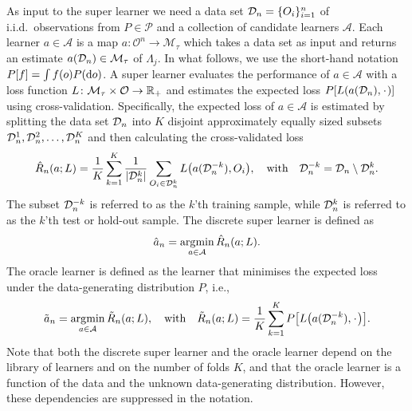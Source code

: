 As input to the super learner we need a data set
\( \mathcal{D}_n=\{O_i\}_{i=1}^n \) of i.i.d.\ observations from \( P \in \mathcal{P} \) and a collection of candidate
learners $\mathcal{A}$. Each learner \(a \in \mathcal{A}\) is a map
\( a \colon \mathcal{O}^n \rightarrow \mathcal{M}_{\tau}\) which takes a data
set as input and returns an estimate $a(\mathcal{D}_n) \in \mathcal{M}_{\tau}$ of
$\Lambda_{j}$.
In what follows, we use the short-hand notation
\(P[f] = \int f(o) P(\mathop{}\!\mathrm{d} o) \). A super learner evaluates the
performance of \(a \in \mathcal{A}\) with a loss function
\(L\colon \mathcal{M}_{\tau} \times \mathcal{O} \rightarrow \mathbb{R}_+\) and
estimates the expected loss \(P[L(a(\data_n), \blank)]\) using
cross-validation. Specifically, the expected loss of $a\in\mathcal A$
is estimated by splitting the data set $\mathcal{D}_n$ into $K$ disjoint
approximately equally sized subsets
\(\mathcal{D}_n^1, \mathcal{D}_n^2, \dots, \mathcal{D}_n^K \) and then calculating the
cross-validated loss
\begin{equation*}
  \hat{R}_n(a; L) =
  \frac{1}{K}\sum_{k=1}^{K}
  \frac{1}{| \mathcal{D}_n^{k} |}\sum_{O_i \in \mathcal{D}_n^{k}}
  L
  {
    \left(
      a{ (\mathcal{D}_n^{-k})}
      , O_i
    \right)
  },
  \quad \text{with} \quad
  \mathcal{D}_n^{-k} = \mathcal{D}_n \setminus \mathcal{D}_n^{k}.
\end{equation*}
The subset \(\mathcal{D}_n^{-k}\) is referred to as the \(k\)'th training
sample, while \(\mathcal{D}_n^{k}\) is referred to as the \(k\)'th test or
hold-out sample.
The discrete super learner is defined as
\begin{equation*}
\hat{a}_n = \operatorname*{\arg\!\min}_{a\in\mathcal A}\hat{R}_n(a; L).
\end{equation*}
The oracle learner is defined as the learner that minimises the
expected loss under the data-generating distribution \( P \),
i.e.,
\begin{equation*}
  \tilde{a}_n =
  \argmin_{a \in \mathcal{A}}
  \tilde{R}_n(a; L),
  \quad \text{with} \quad 
  \tilde{R}_n(a; L)=
  \frac{1}{K}\sum_{k=1}^{K} 
  P{
    \left[
      L
      {
        \left(
          a{ (\data_n^{-k})}
          , \blank
        \right)
      }
    \right]}
  .
\end{equation*}
Note that both the discrete super learner and the oracle learner
depend on the library of learners and on the number of folds \(K\),
and that the oracle learner is a function of the data and the unknown
data-generating distribution. However, these dependencies are
suppressed in the notation.



